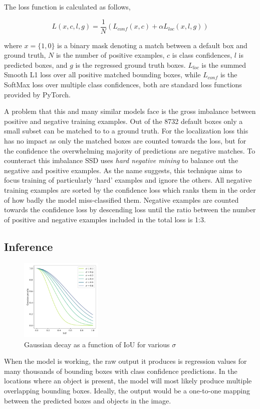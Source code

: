 The loss function is calculated as follows,

\begin{equation}\label{eq:loss}
  L(x,c,l,g)=\frac{1}{N}\left( L_{conf}(x,c) + \alpha L_{loc}(x,l,g)\right)
\end{equation}

where \( x=\{1,0\} \) is a binary mask denoting a match between a default box and ground truth, \( N \) is the number of positive examples, \( c \) is class confidences, \( l \) is predicted boxes, and \( g \) is the regressed ground truth boxes.  \( L_{loc} \) is the summed Smooth L1 loss over all positive matched bounding boxes, while \( L_{conf} \) is the SoftMax loss over multiple class confidences, both are standard loss functions provided by PyTorch.

A problem that this and many similar models face is the gross imbalance between positive and negative training examples.
Out of the 8732 default boxes only a small subset can be matched to to a ground truth.
For the localization loss this has no impact as only the matched boxes are counted towards the loss, but for the confidence the overwhelming majority of predictions are negative matches.
To counteract this imbalance SSD uses \textit{hard negative mining} to balance out the negative and positive examples.
As the name suggests, this technique aims to focus training of particularly `hard' examples and ignore the others.
All negative training examples are sorted by the confidence loss which ranks them in the order of how badly the model miss-classified them.
Negative examples are counted towards the confidence loss by descending loss until the ratio between the number of positive and negative examples included in the total loss is 1:3.

\subsection{Inference}

\begin{figure}
  \centering
  \includegraphics[width=0.35\textwidth]{figs/gausian_penelty.pdf}
  \caption{Gaussian decay as a function of IoU for various \( \sigma \)}\label{fig:gauss}
\end{figure}
When the model is working, the raw output it produces is regression values for many thousands of bounding boxes with class confidence predictions. 
In the locations where an object is present, the model will most likely produce multiple overlapping bounding boxes.
Ideally, the output would be a one-to-one mapping between the predicted boxes and objects in the image.

